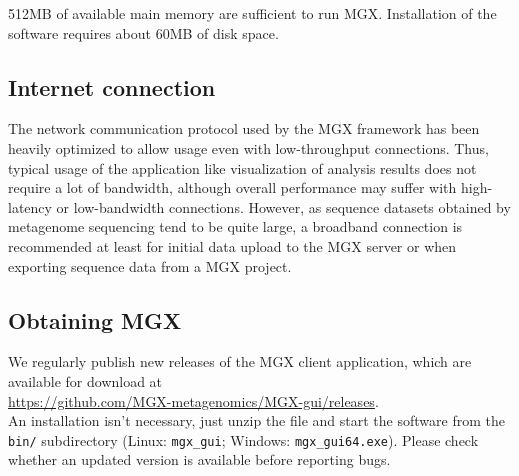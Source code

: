 512MB of available main memory are sufficient to run MGX. Installation of the
software requires about 60MB of disk space.

\subsection{Internet connection}

The network communication protocol used by the MGX framework has been heavily optimized to
allow usage even with low-throughput connections. Thus, typical usage of the application
like visualization of analysis results does not require a lot of bandwidth, although
overall performance may suffer with high-latency or low-bandwidth connections. However, as
sequence datasets obtained by metagenome sequencing tend to be quite large, a broadband 
connection is recommended at least for initial data upload to the MGX server or when exporting
sequence data from a MGX project.

\subsection{Obtaining MGX}

We regularly publish new releases of the MGX client application, which are
available for download at\\

    \url{https://github.com/MGX-metagenomics/MGX-gui/releases}.\\

An installation isn't necessary, just unzip the file and start the software
from the \texttt{bin/} subdirectory (Linux: \texttt{mgx\_gui}; Windows: \texttt{mgx\_gui64.exe}). Please check whether an updated version
is available before reporting bugs.

